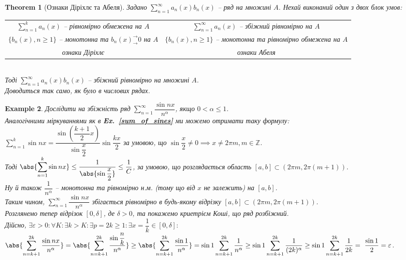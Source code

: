 \documentclass[a4paper, 10pt]{article}
\def\huge{\displaystyle}
\theoremstyle{theoremdd}
\newtheorem{theorem}{Theorem}[subsection]
\theoremstyle{theoremdd}
\theoremstyle{theoremdd}
\theoremstyle{theoremdd}
\theoremstyle{theoremdd}
\newtheorem{example}[theorem]{Example}
\theoremstyle{theoremdd}
\theoremstyle{theoremdd}
\theoremstyle{theoremdd}
\theoremstyle{theoremdd}
\newcommand\exref[1]{\textbf{Ex.~\ref{#1}}}
\begin{document}
\begin{theorem}[Ознаки Діріхлє та Абеля]
Задано  $\huge \sum_{n=1}^\infty a_n(x) b_n(x)$ -- ряд на множині $A$. Нехай виконаний один з двох блок умов:\\
\begin{tabular}{c | c}
$\huge\sum_{n=1}^k a_n(x)$ -- рівномірно обмежена на $A$ & $\huge \sum_{n=1}^{\infty} a_n(x)$ -- збіжний рівномірно на $A$ \\
$\{b_n(x), n \geq 1\}$ -- монотонна та $b_n(x)^\rightarrow_\rightarrow 0$ на $A$ & $\{b_n(x), n \geq 1\}$ -- монотонна та рівномірно обмежена на $A$\\
\textit{ознаки Діріхлє} & \textit{ознаки Абеля}
\end{tabular}\\
Тоді $\huge \sum_{n=1}^{\infty} a_n(x) b_n(x)$ -- збіжний рівномірно на множині $A$.\\
\textit{Доводиться так само, як було в числових рядах.}
\end{theorem}

\begin{example}
Дослідити на збіжність ряд $\huge\sum_{n=1}^\infty \dfrac{\sin nx}{n^\alpha}$, якщо $0 < \alpha \leq 1$.\\
Аналогічними міркуваннями як в \exref{sum_of_sines} ми можемо отримати таку формулу:\\
$\huge\sum_{n=1}^k \sin nx = \dfrac{\sin \left(\dfrac{k+1}{2}x \right)}{\sin \dfrac{x}{2}} \sin \dfrac{kx}{2}$ за умовою, що $\sin \dfrac{x}{2} \neq 0 \implies x \neq 2 \pi m, m \in \mathbb{Z}$.\\
Тоді $\abs{\huge\sum_{n=1}^k \sin n x} \leq \dfrac{1}{\abs{\sin \dfrac{x}{2}}} \leq \dfrac{1}{C}$, за умовою, що розглядається область $[a,b] \subset (2\pi m, 2 \pi (m+1))$.\\
Ну й також $\dfrac{1}{n^\alpha}$ -- монотонна та рівномірно н.м. (тому що від $x$ не залежить) на $[a,b]$.\\
Таким чином, $\huge\sum_{n=1}^\infty \dfrac{\sin nx}{n^\alpha}$ збігається рівномірно в будь-якому відрізку $[a,b] \subset (2\pi m, 2 \pi (m+1))$.
\bigskip \\
Розглянемо тепер відрізок $[0,\delta]$, де $\delta > 0$, та покажемо криетрієм Коші, що ряд розбіжний.\\
Дійсно, $\exists \varepsilon > 0: \forall K: \exists k > K: \exists p = 2k \geq 1: \exists x = \dfrac{1}{k} \in [0,\delta]:$\\
$\huge\abs{\sum_{n=k+1}^{2k} \dfrac{\sin nx}{n^\alpha}} =\abs{\sum_{n=k+1}^{2k} \dfrac{\sin \dfrac{n}{k}}{n^\alpha}} \geq \abs{\sum_{n=k+1}^{2k} \dfrac{\sin 1}{n^\alpha}} = \sin 1 \sum_{n=k+1}^{2k} \dfrac{1}{n^\alpha} \geq \sin 1 \sum_{n=k+1}^{2k} \dfrac{1}{(2k)^\alpha} \geq \sin 1\sum_{n=k+1}^{2k} \dfrac{1}{2k} = ~{\dfrac{\sin 1}{2} = \varepsilon}$.
\end{example}
\end{document}
